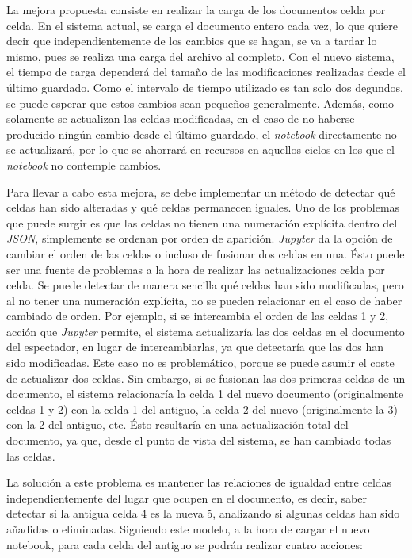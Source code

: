 \documentclass[11pt,spanish,listoffigures]{tfgetsinf}
\begin{document}
La mejora propuesta consiste en realizar la carga de los documentos celda por celda. En el sistema actual, se carga el documento entero cada vez, lo que quiere decir que independientemente de los cambios que se hagan, se va a tardar lo mismo, pues se realiza una carga del archivo al completo. Con el nuevo sistema, el tiempo de carga dependerá del tamaño de las modificaciones realizadas desde el último guardado. Como el intervalo de tiempo utilizado es tan solo dos degundos, se puede esperar que estos cambios sean pequeños generalmente. Además, como solamente se actualizan las celdas modificadas, en el caso de no haberse producido ningún cambio desde el último guardado, el \textit{notebook} directamente no se actualizará, por lo que se ahorrará en recursos en aquellos  ciclos en los que el \textit{notebook} no contemple cambios.

Para llevar a cabo esta mejora, se debe implementar un método de detectar qué celdas han sido alteradas y qué celdas permanecen iguales. Uno de los problemas que puede surgir es que las celdas no tienen una numeración explícita dentro del \textit{JSON}, simplemente se ordenan por orden de aparición. \textit{Jupyter} da la opción de cambiar el orden de las celdas o incluso de fusionar dos celdas en una. Ésto puede ser una fuente de problemas a la hora de realizar las actualizaciones celda por celda. Se puede detectar de manera sencilla qué celdas han sido modificadas, pero al no tener una numeración explícita, no se pueden relacionar en el caso de haber cambiado de orden. Por ejemplo, si se intercambia el orden de las celdas 1 y 2, acción que \textit{Jupyter} permite, el sistema actualizaría las dos celdas en el documento del espectador, en lugar de intercambiarlas, ya que detectaría que las dos han sido modificadas. Este caso no es problemático, porque se puede asumir el coste de actualizar dos celdas. Sin embargo, si se fusionan las dos primeras celdas de un documento, el sistema relacionaría la celda 1 del nuevo documento (originalmente celdas 1 y 2) con la celda 1 del antiguo, la celda 2 del nuevo (originalmente la 3) con la 2 del antiguo, etc. Ésto resultaría en una actualización total del documento, ya que, desde el punto de vista del sistema, se han cambiado todas las celdas. 

La solución a este problema es mantener las relaciones de igualdad entre celdas independientemente del lugar que ocupen en el documento, es decir, saber detectar si la antigua celda 4 es la nueva 5, analizando si algunas celdas han sido añadidas o eliminadas. Siguiendo este modelo, a la hora de cargar el nuevo notebook, para cada celda del antiguo se podrán realizar cuatro acciones:
\end{document}
